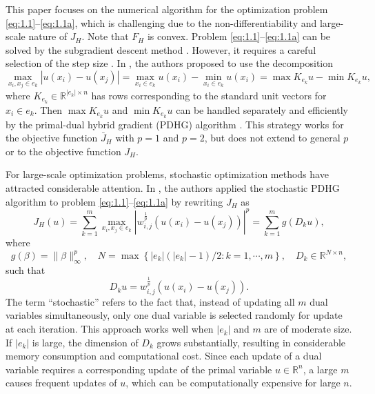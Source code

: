 \documentclass{article}
\theoremstyle{definition}
\begin{document}
This paper focuses on the numerical algorithm for the optimization problem \eqref{eq:1.1}--\eqref{eq:1.1a}, which is challenging due to the non-differentiability and large-scale nature of $J_H$.
Note that $F_H$ is convex. Problem \eqref{eq:1.1}--\eqref{eq:1.1a} can be solved by the subgradient descent method \cite{shor2012minimization}.
However, it requires a careful selection of the step size \cite{zhang2017re}.
In \cite{hein2013total}, the authors proposed to use the decomposition
\begin{equation*}
  \max_{x_i,x_j\in e_k}|u(x_i)-u(x_j)|= \max_{x_i\in e_k} u(x_i)-\min_{x_i\in e_k} u(x_i)
  =\max K_{e_k} u-\min K_{e_k} u,
\end{equation*}
where $K_{e_k} \in \mathbb{R}^{|e_k| \times n}$ has rows corresponding to the standard unit vectors for $x_i \in e_k$.
Then $\max K_{e_k} u$ and $\min K_{e_k} u$ can be handled separately and efficiently by the primal-dual hybrid gradient (PDHG) algorithm \cite{chambolle2011first}.
This strategy works for the objective function $\bar{J}_H$ with $p = 1$ and $p = 2$, but does not extend to general $p$ or to the objective function $J_H$.

For large-scale optimization problems, stochastic optimization methods have attracted considerable attention.
In \cite{shi2025hypergraph}, the authors applied the stochastic PDHG algorithm \cite{chambolle2018stochastic} to problem \eqref{eq:1.1}--\eqref{eq:1.1a} by rewriting $J_H$ as
 \begin{equation*}
   J_H(u)
   =\sum_{k=1}^m\max_{x_i,x_j\in e_k}\left|w_{i,j}^{\frac{1}{p}}(u(x_i)-u(x_j))\right|^p
   =\sum_{k=1}^m g(D_k u),
 \end{equation*}
where
\begin{equation*}
  g(\beta)=\|\beta\|_\infty^p,\quad
  N=\max\left\{{|e_k|(|e_k|-1)}/{2}: k=1,\cdots,m\right\}, \quad
  D_k\in\mathbb{R}^{N\times n},
\end{equation*}
such that
\[
D_ku=w_{i,j}^{\frac{1}{p}}(u(x_i)-u(x_j)).
\]
The term “stochastic” refers to the fact that, instead of updating all $m$ dual variables simultaneously, only one dual variable is selected randomly for update at each iteration.
This approach works well when $|e_k|$ and $m$ are of moderate size.
If $|e_k|$ is large, the dimension of $D_k$ grows substantially, resulting in considerable memory consumption and computational cost.
Since each update of a dual variable requires a corresponding update of the primal variable $u \in \mathbb{R}^n$, a large $m$ causes frequent updates of $u$, which can be computationally expensive for large $n$.
\end{document}
